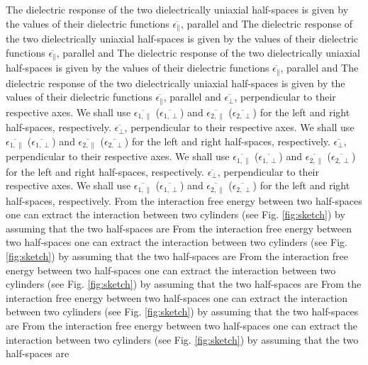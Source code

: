 \documentclass[onecolumn,letterpaper,amsmath,amssymb,floatfix,aps,superscriptaddress]{revtex4}
\begin{document}
The dielectric response of the two dielectrically uniaxial half-spaces is given by the values of their dielectric functions $\overline{\epsilon_{\parallel}}$, parallel and 
The dielectric response of the two dielectrically uniaxial half-spaces is given by the values of their dielectric functions $\overline{\epsilon_{\parallel}}$, parallel and 
The dielectric response of the two dielectrically uniaxial half-spaces is given by the values of their dielectric functions $\overline{\epsilon_{\parallel}}$, parallel and 
The dielectric response of the two dielectrically uniaxial half-spaces is given by the values of their dielectric functions $\overline{\epsilon_{\parallel}}$, parallel and 
$\overline{\epsilon_{\perp}}$, perpendicular to their respective axes.  We shall use $\overline{\epsilon_{1,\parallel}}$ ($\overline{\epsilon_{1,\perp}}$) and 
$\overline{\epsilon_{2,\parallel}}$ ($\overline{\epsilon_{2,\perp}}$) for the left and right half-spaces, respectively. 
$\overline{\epsilon_{\perp}}$, perpendicular to their respective axes.  We shall use $\overline{\epsilon_{1,\parallel}}$ ($\overline{\epsilon_{1,\perp}}$) and 
$\overline{\epsilon_{2,\parallel}}$ ($\overline{\epsilon_{2,\perp}}$) for the left and right half-spaces, respectively. 
$\overline{\epsilon_{\perp}}$, perpendicular to their respective axes.  We shall use $\overline{\epsilon_{1,\parallel}}$ ($\overline{\epsilon_{1,\perp}}$) and 
$\overline{\epsilon_{2,\parallel}}$ ($\overline{\epsilon_{2,\perp}}$) for the left and right half-spaces, respectively. 
$\overline{\epsilon_{\perp}}$, perpendicular to their respective axes.  We shall use $\overline{\epsilon_{1,\parallel}}$ ($\overline{\epsilon_{1,\perp}}$) and 
$\overline{\epsilon_{2,\parallel}}$ ($\overline{\epsilon_{2,\perp}}$) for the left and right half-spaces, respectively. 
From the interaction free energy between two half-spaces one can extract the interaction between two cylinders (see Fig. \ref{fig:sketch}) by assuming that the two half-spaces are 
From the interaction free energy between two half-spaces one can extract the interaction between two cylinders (see Fig. \ref{fig:sketch}) by assuming that the two half-spaces are 
From the interaction free energy between two half-spaces one can extract the interaction between two cylinders (see Fig. \ref{fig:sketch}) by assuming that the two half-spaces are 
From the interaction free energy between two half-spaces one can extract the interaction between two cylinders (see Fig. \ref{fig:sketch}) by assuming that the two half-spaces are 
From the interaction free energy between two half-spaces one can extract the interaction between two cylinders (see Fig. \ref{fig:sketch}) by assuming that the two half-spaces are 
\end{document}
